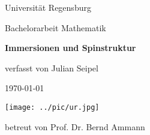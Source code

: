 %
%
%
%
%

	\begin{titlepage}
		\begin{minipage}[c][\textheight][c]{\textwidth}
			\begin{center}
				{Universität Regensburg}
				
				{Bachelorarbeit Mathematik}
				
				\vspace*{0.3cm}
				{ \Huge \textbf{Immersionen und Spinstruktur} }
				
				\vspace*{1cm}
				{\Large verfasst von Julian Seipel}

				
				\vspace*{1cm}
				{\Large \today}
				
				\vspace*{4cm}
				\hspace*{1cm} \texttt{[image: ../pic/ur.jpg]}
				
				\vfill
				{\Large betreut von Prof. Dr. Bernd Ammann}
			\end{center}
		\end{minipage}
	\end{titlepage}